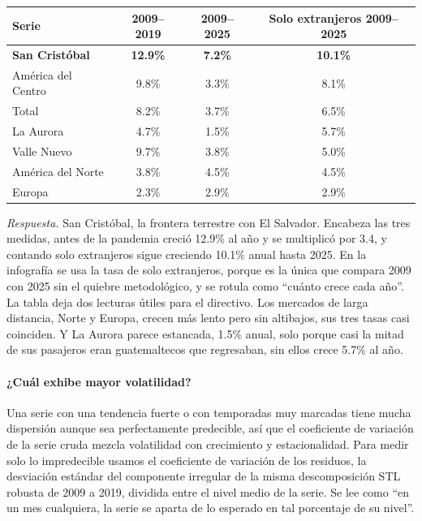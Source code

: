 \begin{center}
\begin{tabular}{@{}lccc@{}}
\toprule
Serie & 2009--2019 & 2009--2025 & Solo extranjeros 2009--2025 \\
\midrule
\textbf{San Cristóbal} & \textbf{12.9\%} & \textbf{7.2\%} & \textbf{10.1\%} \\
América del Centro     & 9.8\%  & 3.3\% & 8.1\% \\
Total                  & 8.2\%  & 3.7\% & 6.5\% \\
La Aurora              & 4.7\%  & 1.5\% & 5.7\% \\
Valle Nuevo            & 9.7\%  & 3.8\% & 5.0\% \\
América del Norte      & 3.8\%  & 4.5\% & 4.5\% \\
Europa                 & 2.3\%  & 2.9\% & 2.9\% \\
\bottomrule
\end{tabular}
\end{center}

\emph{Respuesta.} San Cristóbal, la frontera terrestre con El Salvador. Encabeza las tres
medidas, antes de la pandemia creció 12.9\% al año y se multiplicó por 3.4, y contando solo
extranjeros sigue creciendo 10.1\% anual hasta 2025. En la infografía se usa la tasa de solo
extranjeros, porque es la única que compara 2009 con 2025 sin el quiebre metodológico, y se
rotula como ``cuánto crece cada año''. La tabla deja dos lecturas útiles para el directivo. Los
mercados de larga distancia, Norte y Europa, crecen más lento pero sin altibajos, sus tres tasas
casi coinciden. Y La Aurora parece estancada, 1.5\% anual, solo porque casi la mitad de sus
pasajeros eran guatemaltecos que regresaban, sin ellos crece 5.7\% al año.

\paragraph{¿Cuál exhibe mayor volatilidad?} Una serie con una tendencia fuerte o con temporadas
muy marcadas tiene mucha dispersión aunque sea perfectamente predecible, así que el coeficiente
de variación de la serie cruda mezcla volatilidad con crecimiento y estacionalidad. Para medir
solo lo impredecible usamos el coeficiente de variación de los residuos, la desviación estándar
del componente irregular de la misma descomposición STL robusta de 2009 a 2019, dividida entre
el nivel medio de la serie. Se lee como ``en un mes cualquiera, la serie se aparta de lo esperado
en tal porcentaje de su nivel''.

